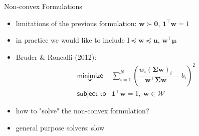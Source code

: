 \documentclass{beamer}
\begin{document}
        \begin{frame}{Non-convex Formulations}
          \vspace{.5cm}
          \begin{itemize}
            \item limitations of the previous formulation: $\bm{w} \succ \mathbf{0}$, $\mathbf{1}^\top\bm{w} = 1$
            \pause
            \vspace{.25cm}
            \item in practice we would like to include $\bm{l} \preceq \bm{w} \preceq \bm{u}$, $\bm{w}^\top\boldsymbol{\mu}$
            \pause
            \vspace{.25cm}
            \item Bruder \& Roncalli (2012):
              \begin{equation*}
              \begin{array}{ll}
                \underset{\bm{w}}{\textsf{minimize}} &
                \sum_{i=1}^{N}\left(\dfrac{w_i(\boldsymbol{\Sigma}\bm{w})_i}{\bm{w}^\top\boldsymbol{\Sigma}\bm{w}} - b_i\right)^2\\
                \textsf{subject to} & \mathbf{1}^\top\bm{w} = 1, ~\bm{w} \in \mathcal{W}
              \end{array}
              \end{equation*}
            \vspace{.25cm}
            \pause
            \item how to "solve" the non-convex formulation?
            \vspace{.25cm}
            \pause
            \item general purpose solvers: slow \Sadey
            \end{itemize}
        \end{frame}
\end{document}
